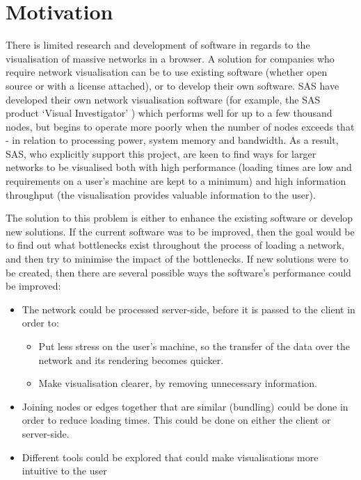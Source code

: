 \documentclass[../dissertation.tex]{subfiles}
\begin{document}
\chapter{Motivation}

There is limited research and development of software in regards to the visualisation of massive networks in a browser. A solution for companies who require network visualisation can be to use existing software (whether open source or with a license attached), or to develop their own software. SAS have developed their own network visualisation software (for example, the SAS product `Visual Investigator' \cite{sasvi}) which performs well for up to a few thousand nodes, but begins to operate more poorly when the number of nodes exceeds that - in relation to processing power, system memory and bandwidth. As a result, SAS, who explicitly support this project, are keen to find ways for larger networks to be visualised both with high performance (loading times are low and requirements on a user's machine are kept to a minimum) and high information throughput (the visualisation provides valuable information to the user).

The solution to this problem is either to enhance the existing software or develop new solutions. If the current software was to be improved, then the goal would be to find out what bottlenecks exist throughout the process of loading a network, and then try to minimise the impact of the bottlenecks. If new solutions were to be created, then there are several possible ways the software's performance could be improved:

\begin{itemize}
	\item The network could be processed server-side, before it is passed to the client in order to:
	\begin{itemize}
	    \item Put less stress on the user's machine, so the transfer of the data over the network and its rendering becomes quicker.
	    \item Make visualisation clearer, by removing unnecessary information.
	\end{itemize}
	\item Joining nodes or edges together that are similar (bundling) could be done in order to reduce loading times. This could be done on either the client or server-side.
	\item Different tools could be explored that could make visualisations more intuitive to the user
\end{itemize}
\end{document}
